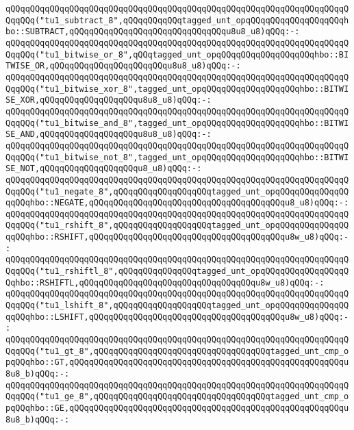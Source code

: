 \verb|qQQqqQQqqQQqqQQqqQQqqQQqqQQqqQQqqQQqqQQqqQQqqQQqqQQqqQQqqQQqqQQqqQQqqQQqqQQq("tu1_subtract_8",qQQqqQQqqQQqtagged_unt_opqQQqqQQqqQQqqQQqqQQqhbo::SUBTRACT,qQQqqQQqqQQqqQQqqQQqqQQqqQQqqQQqu8u8_u8)qQQq:-:|\newline
\verb|qQQqqQQqqQQqqQQqqQQqqQQqqQQqqQQqqQQqqQQqqQQqqQQqqQQqqQQqqQQqqQQqqQQqqQQqqQQq("tu1_bitwise_or_8",qQQqtagged_unt_opqQQqqQQqqQQqqQQqqQQqhbo::BITWISE_OR,qQQqqQQqqQQqqQQqqQQqqQQqu8u8_u8)qQQq:-:|\newline
\verb|qQQqqQQqqQQqqQQqqQQqqQQqqQQqqQQqqQQqqQQqqQQqqQQqqQQqqQQqqQQqqQQqqQQqqQQqqQQq("tu1_bitwise_xor_8",tagged_unt_opqQQqqQQqqQQqqQQqqQQqhbo::BITWISE_XOR,qQQqqQQqqQQqqQQqqQQqu8u8_u8)qQQq:-:|\newline
\verb|qQQqqQQqqQQqqQQqqQQqqQQqqQQqqQQqqQQqqQQqqQQqqQQqqQQqqQQqqQQqqQQqqQQqqQQqqQQq("tu1_bitwise_and_8",tagged_unt_opqQQqqQQqqQQqqQQqqQQqhbo::BITWISE_AND,qQQqqQQqqQQqqQQqqQQqu8u8_u8)qQQq:-:|\newline
\verb|qQQqqQQqqQQqqQQqqQQqqQQqqQQqqQQqqQQqqQQqqQQqqQQqqQQqqQQqqQQqqQQqqQQqqQQqqQQq("tu1_bitwise_not_8",tagged_unt_opqQQqqQQqqQQqqQQqqQQqhbo::BITWISE_NOT,qQQqqQQqqQQqqQQqqQQqu8_u8)qQQq:-:|\newline
\verb|qQQqqQQqqQQqqQQqqQQqqQQqqQQqqQQqqQQqqQQqqQQqqQQqqQQqqQQqqQQqqQQqqQQqqQQqqQQq("tu1_negate_8",qQQqqQQqqQQqqQQqqQQqtagged_unt_opqQQqqQQqqQQqqQQqqQQqhbo::NEGATE,qQQqqQQqqQQqqQQqqQQqqQQqqQQqqQQqqQQqqQQqu8_u8)qQQq:-:|\newline
\verb|qQQqqQQqqQQqqQQqqQQqqQQqqQQqqQQqqQQqqQQqqQQqqQQqqQQqqQQqqQQqqQQqqQQqqQQqqQQq("tu1_rshift_8",qQQqqQQqqQQqqQQqqQQqtagged_unt_opqQQqqQQqqQQqqQQqqQQqhbo::RSHIFT,qQQqqQQqqQQqqQQqqQQqqQQqqQQqqQQqqQQqqQQqu8w_u8)qQQq:-:|\newline
\verb|qQQqqQQqqQQqqQQqqQQqqQQqqQQqqQQqqQQqqQQqqQQqqQQqqQQqqQQqqQQqqQQqqQQqqQQqqQQq("tu1_rshiftl_8",qQQqqQQqqQQqqQQqtagged_unt_opqQQqqQQqqQQqqQQqqQQqhbo::RSHIFTL,qQQqqQQqqQQqqQQqqQQqqQQqqQQqqQQqqQQqu8w_u8)qQQq:-:|\newline
\verb|qQQqqQQqqQQqqQQqqQQqqQQqqQQqqQQqqQQqqQQqqQQqqQQqqQQqqQQqqQQqqQQqqQQqqQQqqQQq("tu1_lshift_8",qQQqqQQqqQQqqQQqqQQqtagged_unt_opqQQqqQQqqQQqqQQqqQQqhbo::LSHIFT,qQQqqQQqqQQqqQQqqQQqqQQqqQQqqQQqqQQqqQQqu8w_u8)qQQq:-:|\newline
\verb|qQQqqQQqqQQqqQQqqQQqqQQqqQQqqQQqqQQqqQQqqQQqqQQqqQQqqQQqqQQqqQQqqQQqqQQqqQQq("tu1_gt_8",qQQqqQQqqQQqqQQqqQQqqQQqqQQqqQQqqQQqtagged_unt_cmp_opqQQqhbo::GT,qQQqqQQqqQQqqQQqqQQqqQQqqQQqqQQqqQQqqQQqqQQqqQQqqQQqqQQqu8u8_b)qQQq:-:|\newline
\verb|qQQqqQQqqQQqqQQqqQQqqQQqqQQqqQQqqQQqqQQqqQQqqQQqqQQqqQQqqQQqqQQqqQQqqQQqqQQq("tu1_ge_8",qQQqqQQqqQQqqQQqqQQqqQQqqQQqqQQqqQQqtagged_unt_cmp_opqQQqhbo::GE,qQQqqQQqqQQqqQQqqQQqqQQqqQQqqQQqqQQqqQQqqQQqqQQqqQQqqQQqu8u8_b)qQQq:-:|\newline
